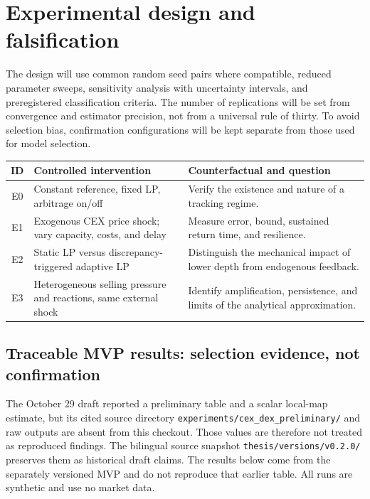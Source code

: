 \section{Experimental design and falsification}

The design will use common random seed pairs where compatible, reduced parameter
sweeps, sensitivity analysis with uncertainty intervals, and preregistered
classification criteria. The number of replications will be set from convergence and
estimator precision, not from a universal rule of thirty. To avoid selection bias,
confirmation configurations will be kept separate from those used for model selection.

\begin{table}[!ht]
\centering
\small
\begin{tabularx}{\textwidth}{@{}c p{4.2cm} X@{}}
\toprule
\textbf{ID} & \textbf{Controlled intervention} & \textbf{Counterfactual and question} \\
\midrule
E0 & Constant reference, fixed LP, arbitrage on/off & Verify the existence and nature
  of a tracking regime. \\
E1 & Exogenous CEX price shock; vary capacity, costs, and delay & Measure error, bound,
  sustained return time, and resilience. \\
E2 & Static LP versus discrepancy-triggered adaptive LP & Distinguish the mechanical
  impact of lower depth from endogenous feedback. \\
E3 & Heterogeneous selling pressure and reactions, same external shock & Identify
  amplification, persistence, and limits of the analytical approximation. \\
\bottomrule
\end{tabularx}
\end{table}

\subsection{Traceable MVP results: selection evidence, not confirmation}

The October 29 draft reported a preliminary table and a scalar local-map estimate, but
its cited source directory \texttt{experiments/cex\_dex\_preliminary/} and raw outputs
are absent from this checkout. Those values are therefore not treated as reproduced
findings. The bilingual source snapshot \texttt{thesis/versions/v0.2.0/} preserves
them as historical draft claims. The results below come from the separately versioned
MVP and do not reproduce that earlier table. All runs are synthetic and use no market
data.


